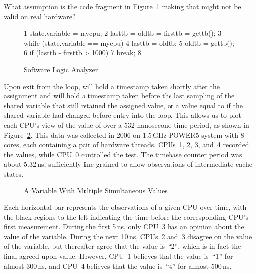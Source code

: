 \QuickQuiz{}
	What assumption is the code fragment
	in Figure~\ref{fig:advsync:Software Logic Analyzer}
	making that might not be valid on real hardware?
 \QuickQuizEnd

\begin{figure}[tbp]
{ \scriptsize
\begin{verbbox}
  1 state.variable = mycpu;
  2 lasttb = oldtb = firsttb = gettb();
  3 while (state.variable == mycpu) {
  4   lasttb = oldtb;
  5   oldtb = gettb();
  6   if (lasttb - firsttb > 1000)
  7     break;
  8 }
\end{verbbox}
}
\centering
\theverbbox
\caption{Software Logic Analyzer}
\label{fig:advsync:Software Logic Analyzer}
\end{figure}

Upon exit from the loop,  will hold a timestamp
taken shortly after the assignment and  will hold
a timestamp taken before the last sampling of the shared variable
that still retained the assigned value, or a value equal to 
if the shared variable had changed before entry into the loop.
This allows us to plot each CPU's view of the value of 
over a 532-nanosecond time period, as shown in
Figure~\ref{fig:advsync:A Variable With Multiple Simultaneous Values}.
This data was collected in 2006 on 1.5\,GHz POWER5 system with 8 cores,
each containing a pair of hardware threads.
CPUs~1, 2, 3, and~4 recorded the values, while CPU~0 controlled the test.
The timebase counter period was about 5.32\,ns, sufficiently fine-grained
to allow observations of intermediate cache states.

\begin{figure}[htb]
\centering
{}
\caption{A Variable With Multiple Simultaneous Values}
\label{fig:advsync:A Variable With Multiple Simultaneous Values}
\end{figure}

Each horizontal bar represents the observations of a given CPU over time,
with the black regions to the left indicating the time before the
corresponding CPU's first measurement.
During the first 5\,ns, only CPU~3 has an opinion about the value of the
variable.
During the next 10\,ns, CPUs~2 and~3 disagree on the value of the variable,
but thereafter agree that the value is~``2'', which is in fact
the final agreed-upon value.
However, CPU~1 believes that the value is~``1'' for almost 300\,ns, and
CPU~4 believes that the value is~``4'' for almost 500\,ns.

